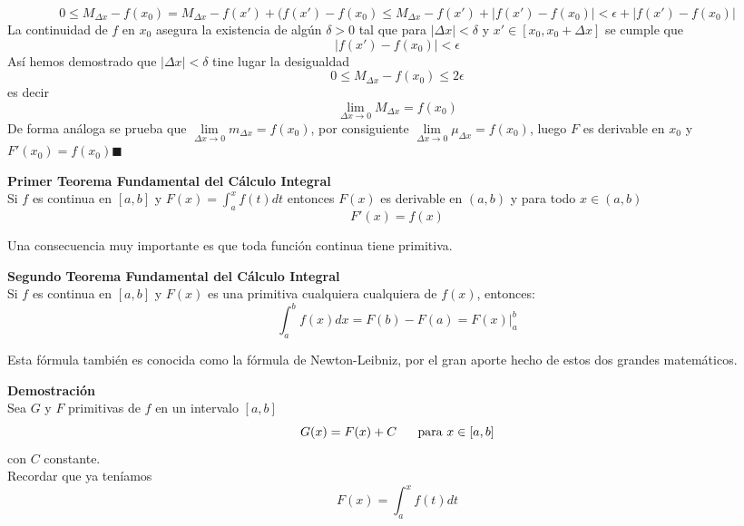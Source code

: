 \documentclass[10pt,twoside]{SelfArx} %
\begin{document}
\begin{equation}
0\leq M_{\Delta x}-f(x_{0})=M_{\Delta x}-f(x')+(f(x')-f(x_{0})\leq M_{\Delta x}-f(x')+|f(x')-f(x_{0})|<\epsilon+|f(x')-f(x_{0})|
\end{equation}
La continuidad de $ f $ en $ x_{0} $ asegura la existencia de algún $ \delta>0  $ tal que para $ |\Delta x|<\delta $ y $ x'\in [x_{0}, x_{0}+\Delta x] $ se cumple que 
\begin{equation}
|f(x')-f(x_{0})|<\epsilon
\end{equation}
Así hemos demostrado que $ |\Delta x|<\delta $ tine lugar la desigualdad 
\begin{equation}
0\leq M_{\Delta x}-f(x_{0})\leq 2\epsilon
\end{equation}
es decir 
\begin{equation}
\lim\limits_{\Delta x\rightarrow0}M_{\Delta x}=f(x_{0})
\end{equation}
De forma análoga se prueba que $ \lim\limits_{\Delta x\rightarrow0}m_{\Delta x}=f(x_{0}) $, por consiguiente $ \lim\limits_{\Delta x\rightarrow0}\mu_{\Delta x}=f(x_{0}) $, luego $ F $ es derivable en  $ x_{0} $ y $ F'(x_{0})=f(x_{0}) \blacksquare$




 \begin{teorema}
 	\textbf{Primer Teorema Fundamental del Cálculo Integral}\\
 	Si $ f $ es continua en $ [a,b] $ y $ F(x)=\int_{a}^{x}f(t)dt $ entonces $ F(x) $ es derivable en $ (a,b) $ y para todo $ x\in(a,b) $ 
 	\begin{equation}
 	F'(x)=f(x)
 	\end{equation}
 \end{teorema} 
 Una consecuencia muy importante es que toda función continua tiene primitiva.
 
 
 \begin{teorema}
 	\textbf{Segundo Teorema Fundamental del Cálculo Integral}\\
 	Si $ f  $ es continua en $ [a,b] $ y $ F(x) $ es una primitiva cualquiera cualquiera de $ f(x) $, entonces:
 	\begin{equation}
 	\int_{a}^{b}f(x)dx=F(b)-F(a)=F(x)\bigg|_{a}^{b}
 	\end{equation}
 \end{teorema}
 Esta fórmula también es conocida como la fórmula de Newton-Leibniz, por el gran aporte hecho de estos dos grandes matem\'aticos.
 
 
 \textbf{Demostración}\\
 Sea $ G $ y $ F $ primitivas de $ f $ en un intervalo $ [a,b] $
 \begin{equation}
 G(x)=F(x)+C\;\;\;\;\;\;	\mbox{para $ x\in [a,b] $}
 \end{equation}
con   $ C $ constante. \\
 Recordar que ya teníamos
\[ F(x) =\int_{a}^{x}f(t)dt \]
\end{document}
